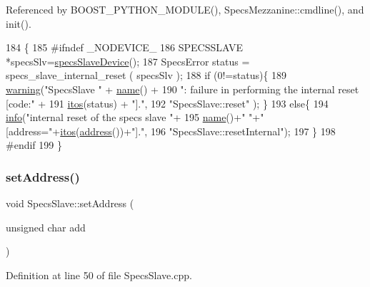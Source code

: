 Referenced by B\+O\+O\+S\+T\+\_\+\+P\+Y\+T\+H\+O\+N\+\_\+\+M\+O\+D\+U\+L\+E(), Specs\+Mezzanine\+::cmdline(), and init().


\begin{DoxyCode}
184                               \{
185 \textcolor{preprocessor}{#ifndef \_NODEVICE\_
}
186   SPECSSLAVE *specsSlv=\hyperlink{classSpecsSlave_a44970aca61b6fdcd6d6d90e6601093f3}{specsSlaveDevice}();
187   SpecsError status = specs\_slave\_internal\_reset ( specsSlv );
188   \textcolor{keywordflow}{if} (0!=status)\{
189     \hyperlink{classObject_a65cd4fda577711660821fd2cd5a3b4c9}{warning}(\textcolor{stringliteral}{"SpecsSlave "} + \hyperlink{classObject_a300f4c05dd468c7bb8b3c968868443c1}{name}() +
190             \textcolor{stringliteral}{": failure in performing the internal reset [code:"} +
191             \hyperlink{Tools_8h_af330027dbdafb9a30768b3613c553e60}{itos}(status) + \textcolor{stringliteral}{"]."},
192             \textcolor{stringliteral}{"SpecsSlave::reset"} );   \}
193   \textcolor{keywordflow}{else}\{
194     \hyperlink{classObject_a644fd329ea4cb85f54fa6846484b84a8}{info}(\textcolor{stringliteral}{"internal reset of the specs slave "}+
195          \hyperlink{classObject_a300f4c05dd468c7bb8b3c968868443c1}{name}()+\textcolor{stringliteral}{" "}+\textcolor{stringliteral}{" [address="}+\hyperlink{Tools_8h_af330027dbdafb9a30768b3613c553e60}{itos}(\hyperlink{classSpecsInterface_a0fa039a15b842a5ba783ce825b9915d8}{address}())+\textcolor{stringliteral}{"]."},
196          \textcolor{stringliteral}{"SpecsSlave::resetInternal"});
197   \}
198 \textcolor{preprocessor}{#endif
}
199 \}
\end{DoxyCode}
\mbox{\label{classSpecsSlave_a1e5917c1f323cd7b4aabe4940c6baf12}} 
\subsubsection{\texorpdfstring{set\+Address()}{setAddress()}}
{\footnotesize\ttfamily void Specs\+Slave\+::set\+Address (\begin{DoxyParamCaption}\item[{unsigned char}]{add }\end{DoxyParamCaption})}



Definition at line 50 of file Specs\+Slave.\+cpp.



